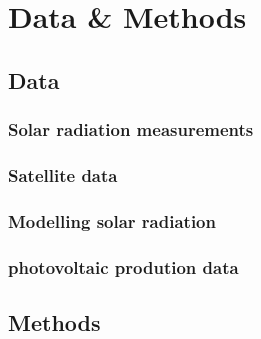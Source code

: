 \part{Data \& Methods\label{cha:data}}

\chapter{Data\label{cha:data}}
\section{Solar radiation measurements}
\section{Satellite data}
\section{Modelling solar radiation}
\section{photovoltaic prodution data}


\chapter{Methods\label{cha:methods}}

